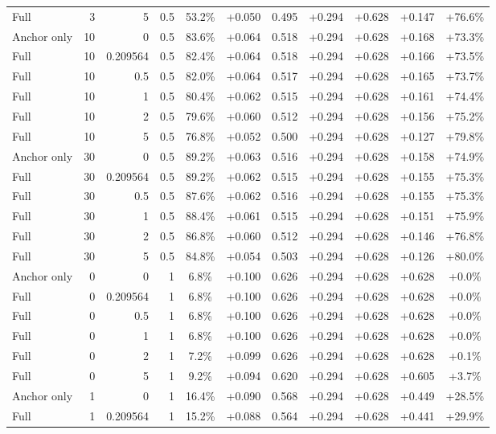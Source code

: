 \begin{table}[htbp]
\begin{tabular}{lrrrccccccc}
Full & 3 & 5 & 0.5 & 53.2\% & +0.050 & 0.495 & +0.294 & +0.628 & +0.147 & +76.6\% \\
Anchor only & 10 & 0 & 0.5 & 83.6\% & +0.064 & 0.518 & +0.294 & +0.628 & +0.168 & +73.3\% \\
Full & 10 & 0.209564 & 0.5 & 82.4\% & +0.064 & 0.518 & +0.294 & +0.628 & +0.166 & +73.5\% \\
Full & 10 & 0.5 & 0.5 & 82.0\% & +0.064 & 0.517 & +0.294 & +0.628 & +0.165 & +73.7\% \\
Full & 10 & 1 & 0.5 & 80.4\% & +0.062 & 0.515 & +0.294 & +0.628 & +0.161 & +74.4\% \\
Full & 10 & 2 & 0.5 & 79.6\% & +0.060 & 0.512 & +0.294 & +0.628 & +0.156 & +75.2\% \\
Full & 10 & 5 & 0.5 & 76.8\% & +0.052 & 0.500 & +0.294 & +0.628 & +0.127 & +79.8\% \\
Anchor only & 30 & 0 & 0.5 & 89.2\% & +0.063 & 0.516 & +0.294 & +0.628 & +0.158 & +74.9\% \\
Full & 30 & 0.209564 & 0.5 & 89.2\% & +0.062 & 0.515 & +0.294 & +0.628 & +0.155 & +75.3\% \\
Full & 30 & 0.5 & 0.5 & 87.6\% & +0.062 & 0.516 & +0.294 & +0.628 & +0.155 & +75.3\% \\
Full & 30 & 1 & 0.5 & 88.4\% & +0.061 & 0.515 & +0.294 & +0.628 & +0.151 & +75.9\% \\
Full & 30 & 2 & 0.5 & 86.8\% & +0.060 & 0.512 & +0.294 & +0.628 & +0.146 & +76.8\% \\
Full & 30 & 5 & 0.5 & 84.8\% & +0.054 & 0.503 & +0.294 & +0.628 & +0.126 & +80.0\% \\
Anchor only & 0 & 0 & 1 & 6.8\% & +0.100 & 0.626 & +0.294 & +0.628 & +0.628 & +0.0\% \\
Full & 0 & 0.209564 & 1 & 6.8\% & +0.100 & 0.626 & +0.294 & +0.628 & +0.628 & +0.0\% \\
Full & 0 & 0.5 & 1 & 6.8\% & +0.100 & 0.626 & +0.294 & +0.628 & +0.628 & +0.0\% \\
Full & 0 & 1 & 1 & 6.8\% & +0.100 & 0.626 & +0.294 & +0.628 & +0.628 & +0.0\% \\
Full & 0 & 2 & 1 & 7.2\% & +0.099 & 0.626 & +0.294 & +0.628 & +0.628 & +0.1\% \\
Full & 0 & 5 & 1 & 9.2\% & +0.094 & 0.620 & +0.294 & +0.628 & +0.605 & +3.7\% \\
Anchor only & 1 & 0 & 1 & 16.4\% & +0.090 & 0.568 & +0.294 & +0.628 & +0.449 & +28.5\% \\
Full & 1 & 0.209564 & 1 & 15.2\% & +0.088 & 0.564 & +0.294 & +0.628 & +0.441 & +29.9\% \\

\end{tabular}
\end{table}
